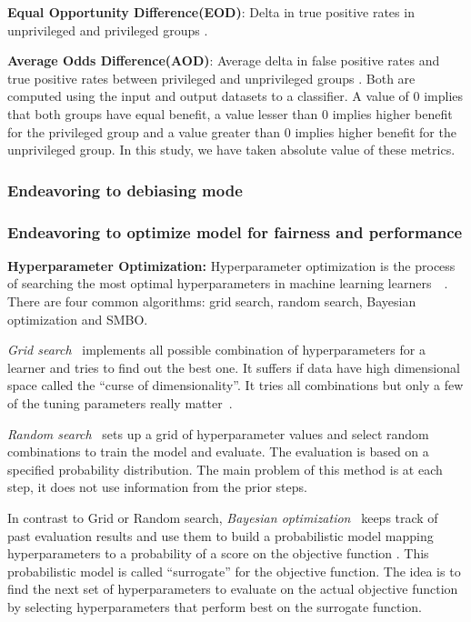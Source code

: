 \bi
\item \textbf{Equal Opportunity Difference(EOD)}:  Delta in true positive rates in unprivileged and privileged groups \cite{IBM}. 
\item \textbf{Average Odds Difference(AOD)}: Average delta in false positive rates and true positive rates between privileged and unprivileged groups \cite{IBM}.
\ei
Both are computed using the input and output datasets to a classifier. A value of 0 implies that both groups have equal benefit, a value lesser than 0 implies higher benefit for the privileged group and a value greater than 0 implies higher benefit for the unprivileged group. In this study, we have taken absolute value of these metrics. 

\subsubsection{Endeavoring to debiasing mode}\label{tion:debiasing}

\subsubsection{Endeavoring to optimize model for fairness and performance}\label{tion:hyper}
\textbf{Hyperparameter Optimization:}
Hyperparameter optimization is the process of searching the most optimal hyperparameters in machine learning learners~\cite{biedenkapp2018hyperparameter}~\cite{franceschi2017forward}. There are four common algorithms: grid search, random search, Bayesian optimization and SMBO.

\textit{Grid search}~\cite{bergstra2011algorithms} implements all possible combination of hyperparameters for a learner and tries to find out the best one. It suffers if data have high dimensional space called the ``curse of dimensionality''. It tries all combinations but only a few of the tuning parameters really matter~\cite{bergstra2012random}.

\textit{Random search}~\cite{bergstra2012random} sets up a grid of hyperparameter values and select random combinations to train the model and evaluate. The evaluation is based on a specified probability distribution. The main problem of this method is at each step, it does not use information from the prior steps. 

In contrast to Grid or Random search, \textit{Bayesian optimization}~\cite{pelikan1999boa} keeps track of past evaluation results and use them to build a probabilistic model mapping hyperparameters to a probability of a score on the objective function \cite{Will_Koehrsen}. This probabilistic model is called ``surrogate'' for the objective function. The idea is to find the next set of hyperparameters to evaluate on the actual objective function by selecting hyperparameters that perform best on the surrogate function.

